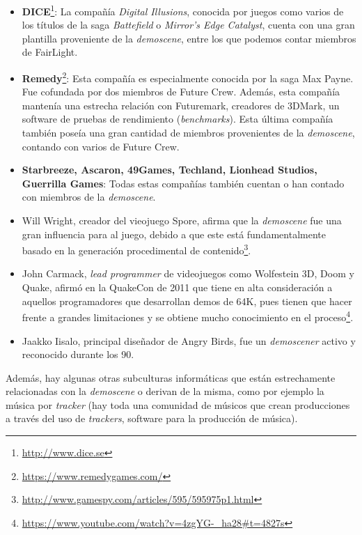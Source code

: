 \begin{itemize}
	\item \textbf{DICE}\footnote{\url{http://www.dice.se}}: La compañía \emph{Digital Illusions}, conocida por juegos como varios de los títulos de la saga \emph{Battefield} o \emph{Mirror's Edge Catalyst}, cuenta con una gran plantilla proveniente de la \emph{demoscene}, entre los que podemos contar miembros de FairLight.
	\item \textbf{Remedy}\footnote{\url{https://www.remedygames.com/}}: Esta compañía es especialmente conocida por la saga Max Payne. Fue cofundada por dos miembros de Future Crew. Además, esta compañía mantenía una estrecha relación con Futuremark, creadores de 3DMark, un software de pruebas de rendimiento (\emph{benchmarks}). Esta última compañía también poseía una gran cantidad de miembros provenientes de la \emph{demoscene}, contando con varios de Future Crew.
	\item \textbf{Starbreeze, Ascaron, 49Games, Techland, Lionhead Studios, Guerrilla Games}: Todas estas compañías también cuentan o han contado con miembros de la \emph{demoscene}.
	\item Will Wright, creador del vieojuego Spore, afirma que la \emph{demoscene} fue una gran influencia para al juego, debido a que este está fundamentalmente basado en la generación procedimental de contenido\footnote{\url{http://www.gamespy.com/articles/595/595975p1.html}}.
	\item John Carmack, \emph{lead programmer} de videojuegos como Wolfestein 3D, Doom y Quake, afirmó en la QuakeCon de 2011 que tiene en alta consideración a aquellos programadores que desarrollan demos de 64K, pues tienen que hacer frente a grandes limitaciones y se obtiene mucho conocimiento en el proceso\footnote{\url{https://www.youtube.com/watch?v=4zgYG-_ha28\#t=4827s}}.
	\item Jaakko Iisalo, principal diseñador de Angry Birds, fue un \emph{demoscener} activo y reconocido durante los 90.
\end{itemize}

Además, hay algunas otras subculturas informáticas que están estrechamente relacionadas con la \emph{demoscene} o derivan de la misma, como por ejemplo la música por \emph{tracker} (hay toda una comunidad de músicos que crean producciones a través del uso de \emph{trackers}, software para la producción de música).


